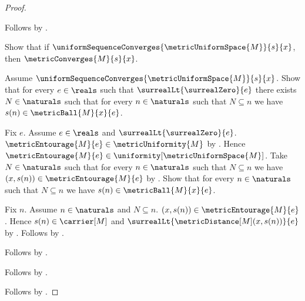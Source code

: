 \begin{proof}
\begin{subproof}
\begin{subproof}
        \end{subproof}
        Follows by .
    \end{subproof}
    Show that if
        $\uniformSequenceConverges{\metricUniformSpace{M}}{s}{x}$, then
        $\metricConverges{M}{s}{x}$.
    \begin{subproof}
        Assume
            $\uniformSequenceConverges{\metricUniformSpace{M}}{s}{x}$.
        Show that for every $e\in\reals$ such that
            $\surrealLt{\surrealZero}{e}$ there exists $N\in\naturals$
            such that for every $n\in\naturals$ such that $N\subseteq n$
            we have $s(n)\in\metricBall{M}{x}{e}$.
        \begin{subproof}
            Fix $e$.
            Assume $e\in\reals$ and
                $\surrealLt{\surrealZero}{e}$.
            $\metricEntourage{M}{e}\in\metricUniformity{M}$
                by .
            Hence
                $\metricEntourage{M}{e}
                    \in\uniformity[\metricUniformSpace{M}]$.
            Take $N\in\naturals$ such that for every $n\in\naturals$
                such that $N\subseteq n$ we have
                $(x,s(n))\in\metricEntourage{M}{e}$
                by .
            Show that for every $n\in\naturals$ such that $N\subseteq n$
                we have $s(n)\in\metricBall{M}{x}{e}$.
            \begin{subproof}
                Fix $n$.
                Assume $n\in\naturals$ and $N\subseteq n$.
                $(x,s(n))\in\metricEntourage{M}{e}$.
                Hence $s(n)\in\carrier[M]$ and
                    $\surrealLt{\metricDistance[M](x,s(n))}{e}$
                    by .
                Follows by .
            \end{subproof}
            Follows by \auto.
        \end{subproof}
        Follows by .
    \end{subproof}
    Follows by \auto.
\end{proof}

